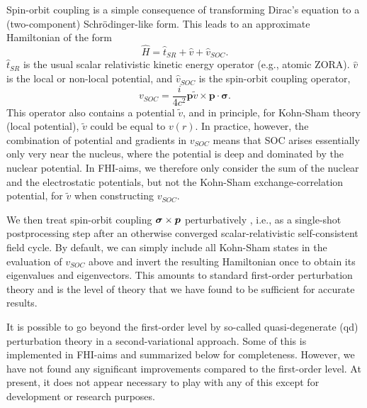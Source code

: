 Spin-orbit coupling is a simple consequence of transforming Dirac's
equation to a (two-component) Schr\"odinger-like form. This leads to
an approximate Hamiltonian of the form
\begin{equation}
  \hat{H} = \hat{t}_{SR} + \hat{v} + \hat{v}_{SOC} .
\end{equation}
$\hat{t}_{SR}$ is the usual scalar relativistic kinetic energy
operator (e.g., atomic ZORA). $\hat{v}$ is the local or non-local
potential, and $\hat{v}_{SOC}$ is the spin-orbit coupling operator,
\begin{equation}
  v_{SOC}=\frac{i}{4c^{2}}\bm{p} \tilde{v} \times \bm{p} \cdot
  \bm{\sigma} .
\end{equation}
This operator also contains a potential $\tilde{v}$, and in principle, for
Kohn-Sham theory (local potential), $\tilde{v}$ could be equal to
$v(r)$. In practice, however, the combination of potential and
gradients in $v_{SOC}$ means that SOC arises essentially only very
near the nucleus, where the potential is deep and dominated by the
nuclear potential. In FHI-aims, we therefore only consider the sum of
the nuclear and the electrostatic potentials, but not the Kohn-Sham
exchange-correlation potential, for $\tilde{v}$ when constructing $v_{SOC}$.

We then treat spin-orbit coupling $\mbox{\boldmath$\sigma$}\times\mbox{\boldmath$p$}$ perturbatively
, i.e., as a single-shot postprocessing step after an otherwise
converged scalar-relativistic self-consistent field cycle. 
By default, we can simply include all Kohn-Sham states in the
evaluation of $v_{SOC}$ above and invert the resulting Hamiltonian
once to obtain its eigenvalues and eigenvectors. This amounts to
standard first-order perturbation theory and is the level of theory
that we have found to be sufficient for accurate results.

It is possible to go beyond the first-order level by so-called
quasi-degenerate (qd) perturbation theory in a second-variational
approach. Some of this is implemented in FHI-aims and summarized below
for completeness. However, we have not found any significant
improvements compared to the first-order level. At present, it does
not appear necessary to play with any of this except for development
or research purposes. 

